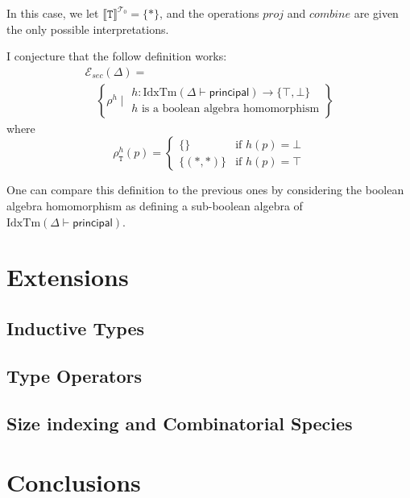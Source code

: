 \documentclass[natbib,preprint]{sigplanconf}
\newcommand{\sepbar}{\mathrel|}
\newcommand{\idxTms}[2]{\mathrm{IdxTm}(#1 \vdash #2)}
\newcommand{\tyPrimNm}[1]{\texttt{#1}}
\newcommand{\relEnv}[1]{\mathcal{#1}}
\newcommand{\tyPrimSem}[1]{\llbracket \tyPrimNm{#1} \rrbracket^{\mathcal{T}_0}}
\begin{document}
In this case, we let $\tyPrimSem{T} = \{*\}$, and the operations
$\mathit{proj}$ and $\mathit{combine}$ are given the only possible
interpretations.

I conjecture that the follow definition works:
\begin{displaymath}
  \begin{array}{l}
    \relEnv{E}_{\mathit{sec}}(\Delta) = \\
    \quad\left\{ \rho^{h} \sepbar
      \begin{array}{l}
        h : \idxTms{\Delta}{\mathsf{principal}} \to \{\top,\bot\} \\
        h\textrm{ is a boolean algebra homomorphism}
      \end{array}
    \right\}
  \end{array}
\end{displaymath}
where
\begin{displaymath}
  \rho^{h}_{\tyPrimNm{T}}(p) = \left\{
    \begin{array}{ll}
      \{\} & \textrm{if }h(p) = \bot \\
      \{(*,*) \} & \textrm{if }h(p) = \top
    \end{array}
  \right.
\end{displaymath}

One can compare this definition to the previous ones by considering
the boolean algebra homomorphism as defining a sub-boolean algebra of
$\idxTms{\Delta}{\mathsf{principal}}$.

\section{Extensions}

\subsection{Inductive Types}

\subsection{Type Operators}

\subsection{Size indexing and Combinatorial Species}

\section{Conclusions}



\end{document}
